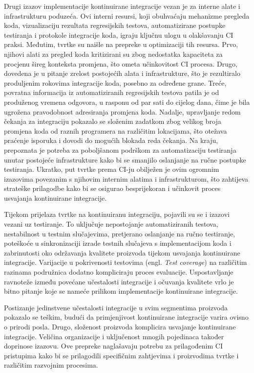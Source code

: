 \documentclass[a4paper,12pt,oneside]{article}
\begin{document}
Drugi izazov implementacije kontinuirane integracije vezan je za interne alate i infrastrukturu poduzeća. Ovi interni resursi, koji obuhvaćaju mehanizme pregleda koda, vizualizaciju rezultata regresijskih testova, automatizirane postupke testiranja i protokole integracije koda, igraju ključnu ulogu u olakšavanju CI praksi. Međutim, tvrtke su naišle na prepreke u optimizaciji tih resursa. Prvo, njihovi alati za pregled koda kritizirani su zbog nedostatka kapaciteta za procjenu šireg konteksta promjena, što ometa učinkovitost CI procesa. Drugo, dovedena je u pitanje zrelost postojećih alata i infrastrukture, što je rezultiralo produljenim rokovima integracije koda, posebno za određene grane. Treće, povratna informacija iz automatiziranih regresijskih testova patila je od produženog vremena odgovora, u rasponu od par sati do cijelog dana, čime je bila ugrožena pravodobnost adresiranja promjena koda. Nadalje, upravljanje redom čekanja za integraciju pokazalo se složenim zadatkom zbog velikog broja promjena koda od raznih programera na različitim lokacijama, što otežava praćenje isporuka i dovodi do mogućih blokada reda čekanja. Na kraju, prepoznata je potreba za poboljšanom podrškom za automatizaciju testiranja unutar postojeće infrastrukture kako bi se smanjilo oslanjanje na ručne postupke testiranja. Ukratko, put tvrtke prema CI-ju obilježen je ovim ogromnim izazovima povezanim s njihovim internim alatima i infrastrukturom, što zahtijeva strateške prilagodbe kako bi se osigurao besprijekoran i učinkovit proces usvajanja kontinuirane integracije.

Tijekom prijelaza tvrtke na kontinuiranu integraciju, pojavili su se i izazovi vezani uz testiranje. To uključuje nepostojanje automatiziranih testova, nestabilnost u testnim slučajevima, pretjerano oslanjanje na ručno testiranje, poteškoće u sinkronizaciji izrade testnih slučajeva s implementacijom koda i zabrinutosti oko održavanja kvalitete proizvoda tijekom usvajanja kontinuirane integracije. Varijacije u pokrivenosti testovima (engl. \textit{Test coverage}) na različitim razinama podružnica dodatno kompliciraju proces evaluacije. Uspostavljanje ravnoteže između povećane učestalosti integracije i očuvanja kvalitete vrlo je bitno pitanje koje se nameće prilikom implementacije kontinuirane integracije.

Postizanje jedinstvene učestalosti integracije u svim segmentima proizvoda pokazalo se teškim, budući da primjenjivost kontinuirane integracije varira ovisno o prirodi posla. Drugo, složenost proizvoda komplicira usvajanje kontinuirane integracije. Veličina organizacije i uključenost mnogih pojedinaca također doprinose izazovu. Ove prepreke naglašavaju potrebu za prilagođenim CI pristupima kako bi se prilagodili specifičnim zahtjevima i proizvodima tvrtke i različitim razvojnim procesima.
\end{document}
